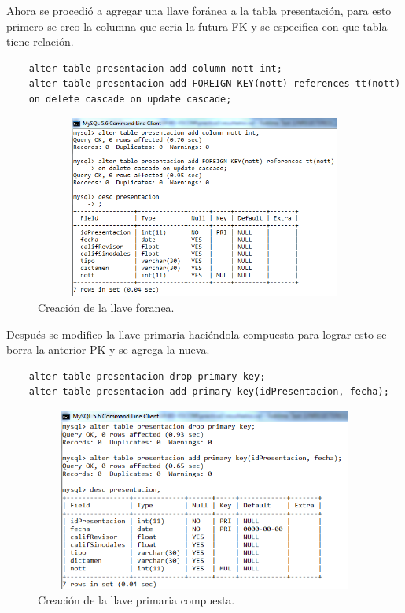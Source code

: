 \documentclass[12pt, titlepage]{article}
\begin{document}
    Ahora se procedió a agregar una llave foránea a la tabla presentación, para esto primero se creo la columna que seria la futura FK y se especifica con que tabla tiene relación.
    \begin{lstlisting}
    alter table presentacion add column nott int;
    alter table presentacion add FOREIGN KEY(nott) references tt(nott)
    on delete cascade on update cascade;
    \end{lstlisting}
    \begin{figure}[H]
        \begin{center}
            \includegraphics[width=12cm, height=6cm]{img/foranea.png}
            \caption{Creación de la llave foranea.}
            \label{fig:foranea}
        \end{center}
    \end{figure}
    Después se modifico la llave primaria haciéndola compuesta para lograr esto se borra la anterior PK y se agrega la nueva.
    \begin{lstlisting}
    alter table presentacion drop primary key;
    alter table presentacion add primary key(idPresentacion, fecha);
    \end{lstlisting}
    \begin{figure}[H]
        \begin{center}
            \includegraphics[width=12cm, height=6cm]{img/primaria.png}
            \caption{Creación de la llave primaria compuesta.}
            \label{fig:primaria}
        \end{center}
    \end{figure}
\end{document}
